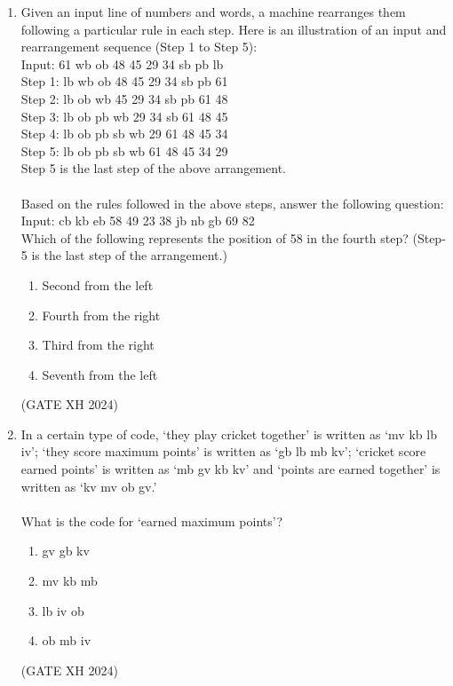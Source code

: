 \documentclass{article}
\begin{document}
\begin{enumerate}
    \item Given an input line of numbers and words, a machine rearranges them following a particular rule in each step. Here is an illustration of an input and rearrangement sequence (Step 1 to Step 5): \\
    Input: 61 wb ob 48 45 29 34 sb pb lb \\
    Step 1: lb wb ob 48 45 29 34 sb pb 61 \\
    Step 2: lb ob wb 45 29 34 sb pb 61 48 \\
    Step 3: lb ob pb wb 29 34 sb 61 48 45 \\
    Step 4: lb ob pb sb wb 29 61 48 45 34 \\
    Step 5: lb ob pb sb wb 61 48 45 34 29 \\
    Step 5 is the last step of the above arrangement. \\  \\
    Based on the rules followed in the above steps, answer the following question: \\
    Input: cb kb eb 58 49 23 38 jb nb gb 69 82 \\
    Which of the following represents the position of 58 in the fourth step? (Step-5 is the last step of the arrangement.)
    \begin{multicols}{2}
    \begin{enumerate}
        \item Second from the left 
        \item Fourth from the right
        \item Third from the right
        \item Seventh from the left
    \end{enumerate} 
    \end{multicols} \hfill (GATE XH 2024)

    \item In a certain type of code, ‘they play cricket together’ is written as ‘mv kb lb iv’; ‘they score maximum points’ is written as ‘gb lb mb kv’; ‘cricket score earned points’ is written as ‘mb gv kb kv’ and ‘points are earned together’ is written as ‘kv mv ob gv.’ \\  \\ What is the code for ‘earned maximum points’?
    
    \begin{multicols}{4}
        \begin{enumerate}
            \item gv gb kv
            \item mv kb mb
            \item lb iv ob
            \item ob mb iv
        \end{enumerate}
    \end{multicols} \hfill (GATE XH 2024)


\end{enumerate}
\end{document}
